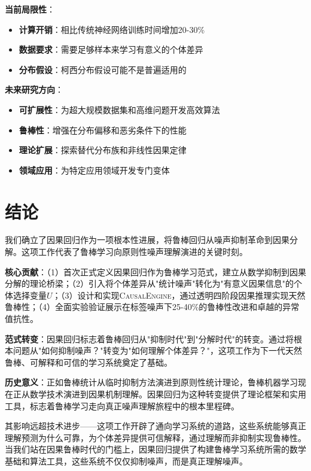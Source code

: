 \documentclass[conference]{IEEEtran}
\newcommand{\causalengine}{\textsc{CausalEngine}}
\begin{document}
\begin{CJK}{UTF8}{gbsn}
\textbf{当前局限性}：
\begin{itemize}
\item \textbf{计算开销}：相比传统神经网络训练时间增加20-30\%
\item \textbf{数据要求}：需要足够样本来学习有意义的个体差异
\item \textbf{分布假设}：柯西分布假设可能不是普遍适用的
\end{itemize}

\textbf{未来研究方向}：
\begin{itemize}
\item \textbf{可扩展性}：为超大规模数据集和高维问题开发高效算法
\item \textbf{鲁棒性}：增强在分布偏移和恶劣条件下的性能
\item \textbf{理论扩展}：探索替代分布族和非线性因果定律
\item \textbf{领域应用}：为特定应用领域开发专门变体
\end{itemize}

\section{结论}
\label{sec:conclusion}

我们确立了因果回归作为一项根本性进展，将鲁棒回归从噪声抑制革命到因果分解。这项工作代表了鲁棒学习向原则性噪声理解演进的关键时刻。

\textbf{核心贡献}：（1）首次正式定义因果回归作为鲁棒学习范式，建立从数学抑制到因果分解的理论桥梁；（2）引入将个体差异从"统计噪声"转化为"有意义因果信息"的个体选择变量$U$；（3）设计和实现\causalengine{}，通过透明四阶段因果推理实现天然鲁棒性；（4）全面实验验证展示在标签噪声下25-40\%的鲁棒性改进和卓越的异常值抗性。

\textbf{范式转变}：因果回归标志着鲁棒回归从"抑制时代"到"分解时代"的转变。通过将根本问题从"如何抑制噪声？"转变为"如何理解个体差异？"，这项工作为下一代天然鲁棒、可解释和可信的学习系统奠定了基础。

\textbf{历史意义}：正如鲁棒统计从临时抑制方法演进到原则性统计理论，鲁棒机器学习现在正从数学技术演进到因果机制理解。因果回归为这种转变提供了理论框架和实用工具，标志着鲁棒学习走向真正噪声理解旅程中的根本里程碑。

其影响远超技术进步——这项工作开辟了通向学习系统的道路，这些系统能够真正理解预测为什么可靠，为个体差异提供可信解释，通过理解而非抑制实现鲁棒性。当我们站在因果鲁棒时代的门槛上，因果回归提供了构建鲁棒学习系统所需的数学基础和算法工具，这些系统不仅仅抑制噪声，而是真正理解噪声。





\end{CJK}
\end{document}
